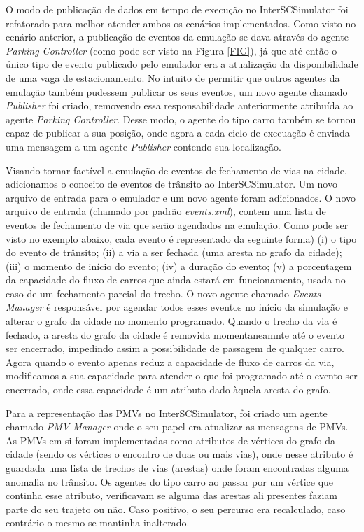 O modo de publicação de dados em tempo de execução no InterSCSimulator foi refatorado para melhor atender ambos os cenários implementados.
Como visto no cenário anterior, a publicação de eventos da emulação se dava através do agente \textit{Parking Controller} (como pode ser visto na Figura \ref{FIG}), já que
até então o único tipo de evento publicado pelo emulador era a atualização da disponibilidade de uma vaga de estacionamento.
No intuito de permitir que outros agentes da emulação também pudessem publicar os seus eventos, um novo agente chamado \textit{Publisher} foi criado, removendo essa responsabilidade
anteriormente atribuída ao agente \textit{Parking Controller}.
Desse modo, o agente do tipo carro também se tornou capaz de publicar a sua posição, onde agora a cada ciclo de execuação é enviada uma mensagem a um agente \textit{Publisher}
contendo sua localização.

Visando tornar factível a emulação de eventos de fechamento de vias na cidade, adicionamos o conceito de eventos de trânsito ao InterSCSimulator.
Um novo arquivo de entrada para o emulador e um novo agente foram adicionados.
O novo arquivo de entrada (chamado por padrão \textit{events.xml}), contem uma lista de eventos de fechamento de via que serão agendados na emulação.
Como pode ser visto no exemplo abaixo, cada evento é representado da seguinte forma)
(i) o tipo do evento de trânsito;
(ii) a via a ser fechada (uma aresta no grafo da cidade);
(iii) o momento de início do evento;
(iv) a duração do evento;
(v) a porcentagem da capacidade do fluxo de carros que ainda estará em funcionamento, usada no caso de um fechamento parcial do trecho.
O novo agente chamado \textit{Events Manager} é responsável por agendar todos esses eventos no início da simulação e alterar o grafo da cidade no momento programado.
Quando o trecho da via é fechado, a aresta do grafo da cidade é removida momentaneamnte até o evento ser encerrado, impedindo assim a possibilidade de passagem de qualquer
carro.
Agora quando o evento apenas reduz a capacidade de fluxo de carros da via, modificamos a sua capacidade para atender o que foi programado até o evento ser encerrado,
onde essa capacidade é um atributo dado àquela aresta do grafo.


Para a representação das PMVs no InterSCSimulator, foi criado um agente chamado \textit{PMV Manager} onde o seu papel era atualizar as mensagens de PMVs.
As PMVs em si foram implementadas como atributos de vértices do grafo da cidade (sendo os vértices o encontro de duas ou mais vias), onde nesse atributo é guardada uma lista
de trechos de vias (arestas) onde foram encontradas alguma anomalia no trânsito.
Os agentes do tipo carro ao passar por um vértice que continha esse atributo, verificavam se alguma das arestas ali presentes faziam parte do seu trajeto ou não.
Caso positivo, o seu percurso era recalculado, caso contrário o mesmo se mantinha inalterado.

